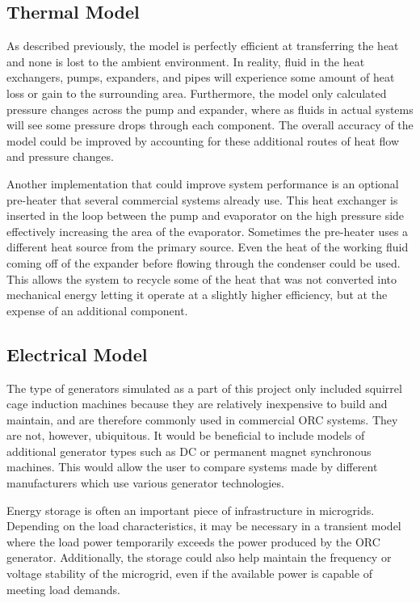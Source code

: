 \subsection{Thermal Model}
As described previously, 
the model is perfectly efficient at transferring the heat and none is lost to the ambient environment. In reality, fluid in the heat exchangers, pumps, expanders, and pipes will experience some amount of heat loss or gain to the surrounding area. Furthermore, the model only calculated pressure changes across the pump and expander, where as fluids in actual systems will see some pressure drops through each component. The overall accuracy of the model could be improved by accounting for these additional routes of heat flow and pressure changes.

Another implementation that could improve system performance is an optional pre-heater that several commercial systems already use. This heat exchanger is inserted in the loop between the pump and evaporator on the high pressure side effectively increasing the area of the evaporator. Sometimes the pre-heater uses a different heat source from the primary source. Even the heat of the working fluid coming off of the expander before flowing through the condenser could be used. This allows the system to recycle some of the heat that was not converted into mechanical energy letting it operate at a slightly higher efficiency, but at the expense of an additional component.

\subsection{Electrical Model}
The type of generators simulated as a part of this project only included squirrel cage induction machines because they are relatively inexpensive to build and maintain, and are therefore commonly used in commercial ORC systems. They are not, however, ubiquitous. It would be beneficial to include models of additional generator types such as DC or permanent magnet synchronous machines. This would allow the user to compare systems made by different manufacturers which use various generator technologies.

Energy storage is often an important piece of infrastructure in microgrids. Depending on the load characteristics, it may be necessary in a transient model where the load power temporarily exceeds the power produced by the ORC generator. Additionally, the storage could also help maintain the frequency or voltage stability of the microgrid, even if the available power is capable of meeting load demands.

